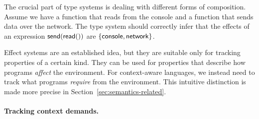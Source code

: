 The crucial part of type systems is dealing with different forms of composition. Assume
we have a function  that reads from the console and a function  that sends
data over the network. The type system should correctly infer that the effects of an
expression $\textnormal{\sffamily send}(\textnormal{\sffamily read}())$ are $\{ \textnormal{\sffamily console}, \textnormal{\sffamily network} \}$.

Effect systems are an established idea, but they are suitable only for tracking properties of a
certain kind. They can be used for properties that describe how programs \emph{affect} the environment.
For context-aware languages, we instead need to track what programs \emph{require} from the 
environment. This intuitive distinction is made more precise in Section~\ref{sec:semantics-related}. 

\paragraph{Tracking context demands.}

